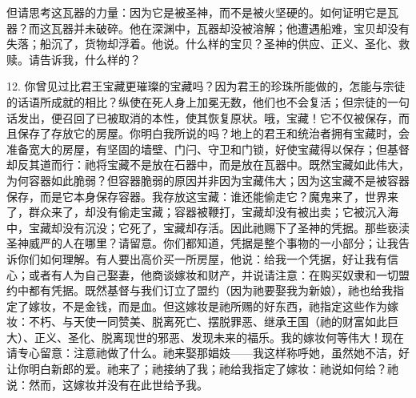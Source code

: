 但请思考这瓦器的力量：因为它是被圣神，而不是被火坚硬的。如何证明它是瓦器？而这瓦器并未破碎。他在深渊中，瓦器却没被溶解；他遭遇船难，宝贝却没有失落；船沉了，货物却浮着。他说。什么样的宝贝？圣神的供应、正义、圣化、救赎。请告诉我，什么样的？     \par

12. 你曾见过比君王宝藏更璀璨的宝藏吗？因为君王的珍珠所能做的，怎能与宗徒的话语所成就的相比？纵使在死人身上加冕无数，他们也不会复活；但宗徒的一句话发出，便召回了已被取消的本性，使其恢复原状。哦，宝藏！它不仅被保存，而且保存了存放它的房屋。你明白我所说的吗？地上的君王和统治者拥有宝藏时，会准备宽大的房屋，有坚固的墙壁、门闩、守卫和门锁，好使宝藏得以保存；但基督却反其道而行：祂将宝藏不是放在石器中，而是放在瓦器中。既然宝藏如此伟大，为何容器如此脆弱？但容器脆弱的原因并非因为宝藏伟大；因为这宝藏不是被容器保存，而是它本身保存容器。我存放这宝藏：谁还能偷走它？魔鬼来了，世界来了，群众来了，却没有偷走宝藏；容器被鞭打，宝藏却没有被出卖；它被沉入海中，宝藏却没有沉没；它死了，宝藏却存活。因此祂赐下了圣神的凭据。那些亵渎圣神威严的人在哪里？请留意。你们都知道，凭据是整个事物的一小部分；让我告诉你们如何理解。有人要出高价买一所房屋，他说：给我一个凭据，好让我有信心；或者有人为自己娶妻，他商谈嫁妆和财产，并说请注意：在购买奴隶和一切盟约中都有凭据。既然基督与我们订立了盟约（因为祂要娶我为新娘），祂也给我指定了嫁妆，不是金钱，而是血。但这嫁妆是祂所赐的好东西，祂指定这些作为嫁妆：不朽、与天使一同赞美、脱离死亡、摆脱罪恶、继承王国（祂的财富如此巨大）、正义、圣化、脱离现世的邪恶、发现未来的福乐。我的嫁妆何等伟大！现在请专心留意：注意祂做了什么。祂来娶那娼妓——我这样称呼她，虽然她不洁，好让你明白新郎的爱。祂来了；祂接纳了我；祂给我指定了嫁妆：祂说如何给？祂说：然而，这嫁妆并没有在此世给予我。\par

